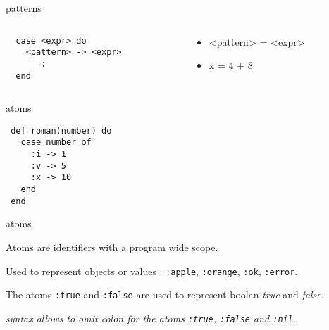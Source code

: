 \begin{frame}[fragile]{patterns}

  \begin{columns}[t]
    \begin{column}{0.5\textwidth}
\begin{verbatim}
  case <expr> do 
    <pattern> -> <expr>
       :
  end
\end{verbatim}
    \end{column}\pause
    \begin{column}{0.5\textwidth}
      \begin{itemize}
      \item <pattern> = <expr> \pause
      \item x = 4 + 8 \pause
      \end{itemize}
    \end{column}
  \end{columns}
  
\end{frame}


\begin{frame}[fragile]{atoms}

\begin{verbatim}
 def roman(number) do 
   case number of
     :i -> 1
     :v -> 5
     :x -> 10
   end
 end   
\end{verbatim}
\end{frame}

\begin{frame}{atoms}

  Atoms are identifiers with a program wide scope. \pause

  \vspace{20pt}
  Used to represent objects or values : {\tt :apple}, {\tt :orange}, {\tt :ok}, {\tt :error}. \pause

  \vspace{20pt}
  The atoms {\tt :true} and {\tt :false} are used to represent boolan {\em true} and {\em false}.\pause
  

  \vspace{20pt}
  {\em syntax allows to omit colon for the atoms {\tt :true}, {\tt :false} and {\tt :nil}.}
    
\end{frame}

